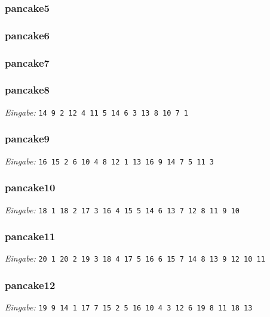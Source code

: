 \documentclass[a4paper, 10pt, ngerman]{article}
\begin{document}
\subsubsection{pancake5}


\subsubsection{pancake6}


\subsubsection{pancake7}


\subsubsection{pancake8}
\scriptsize \emph{Eingabe:} \verb|14 9 2 12 4 11 5 14 6 3 13 8 10 7 1|
\normalsize


\subsubsection{pancake9}
\scriptsize \emph{Eingabe:} \verb|16 15 2 6 10 4 8 12 1 13 16 9 14 7 5 11 3|
\normalsize


\subsubsection{pancake10}
\scriptsize \emph{Eingabe: }\verb|18 1 18 2 17 3 16 4 15 5 14 6 13 7 12 8 11 9 10|
\normalsize


\subsubsection{pancake11}
\scriptsize \emph{Eingabe: }\verb|20 1 20 2 19 3 18 4 17 5 16 6 15 7 14 8 13 9 12 10 11|
\normalsize


\subsubsection{pancake12}
\scriptsize \emph{Eingabe: }\verb|19 9 14 1 17 7 15 2 5 16 10 4 3 12 6 19 8 11 18 13|
\normalsize

\end{document}
